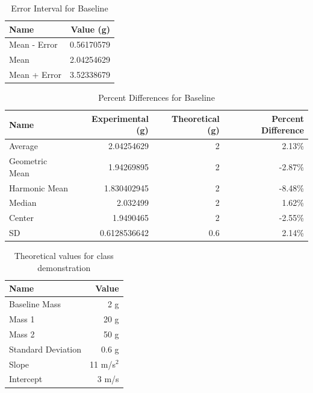 \begin{table}
    \centering
	\begin{tabular}{|l|r|} \hline
		\textbf{Name} & \textbf{Value (g)} \\
		\hline
		Mean - Error & 0.56170579 \\
		Mean & 2.04254629 \\
		Mean + Error & 3.52338679 \\
		\hline
	\end{tabular}
	\caption{Error Interval for Baseline}
	\label{table.baseline.interval}
\end{table}
\begin{table}
    \centering
	\begin{tabular}{|l|r|r|r|} \hline
		\textbf{Name} & \textbf{Experimental (g)} & \textbf{Theoretical (g)} & \textbf{Percent Difference} \\
		\hline
        Average & 2.04254629 & 2 & 2.13\% \\
        Geometric Mean & 1.94269895 & 2 & -2.87\% \\
        Harmonic Mean & 1.830402945 & 2 & -8.48\% \\
        Median & 2.032499 & 2 & 1.62\% \\
        Center & 1.9490465 & 2 & -2.55\% \\
        \hline
        SD & 0.6128536642 & 0.6 & 2.14\% \\
		\hline
	\end{tabular}
	\caption{Percent Differences for Baseline}
	\label{table.baseline.percent}
\end{table}
\begin{table}
    \centering
    \begin{tabular}{|l|r|}
        \hline
        \textbf{Name} & \textbf{Value} \\
        \hline
        Baseline Mass & 2 g \\
        Mass 1 & 20 g \\
        Mass 2 & 50 g \\
        Standard Deviation & 0.6 g \\
        \hline
        Slope & 11 m/s$^{2}$ \\
        Intercept & 3 m/s \\
        \hline
    \end{tabular}
    \caption{Theoretical values for class demonstration}
    \label{table.theoretical.demo}
\end{table}
